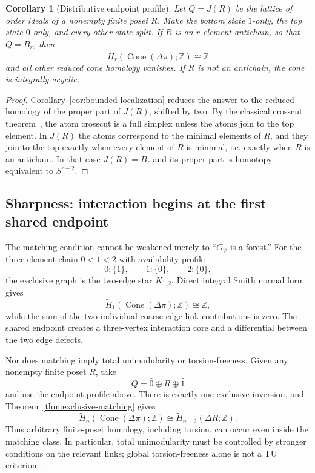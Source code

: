 \documentclass[11pt]{article}
\newtheorem{corollary}[theorem]{Corollary}
\newcommand{\Cone}{\operatorname{Cone}}
\begin{document}
\begin{corollary}[Distributive endpoint profile]
\label{cor:distributive-endpoint}
Let $Q=J(R)$ be the lattice of order ideals of a nonempty finite poset $R$.  Make the
bottom state $1$-only, the top state $0$-only, and every other state split.  If
$R$ is an $r$-element antichain, so that $Q=B_r$, then
\[
\widetilde H_r(\Cone(\Delta\pi);\mathbb Z)\cong\mathbb Z
\]
and all other reduced cone homology vanishes.  If $R$ is not an antichain,
the cone is integrally acyclic.
\end{corollary}

\begin{proof}
Corollary~\ref{cor:bounded-localization} reduces the answer to the reduced
homology of the proper part of $J(R)$, shifted by two.  By the classical crosscut theorem~\cite{Bjorner1995}, the atom crosscut is a
full simplex unless the atoms join to the top element.  In $J(R)$ the atoms
correspond to the minimal elements of $R$, and they join to the top exactly
when every element of $R$ is minimal, i.e. exactly when $R$ is an antichain.
In that case $J(R)=B_r$ and its proper part is homotopy equivalent to
$S^{r-2}$.
\end{proof}

\subsection{Sharpness: interaction begins at the first shared endpoint}

The matching condition cannot be weakened merely to ``$G_\psi$ is a
forest.''  For the three-element chain $0<1<2$ with availability profile
\[
0:\{1\},\qquad 1:\{0\},\qquad 2:\{0\},
\]
the exclusive graph is the two-edge star $K_{1,2}$.  Direct integral Smith
normal form gives
\[
\widetilde H_1(\Cone(\Delta\pi);\mathbb Z)\cong\mathbb Z,
\]
while the sum of the two individual coarse-edge-link contributions is zero.
The shared endpoint creates a three-vertex interaction core and a differential
between the two edge defects.

Nor does matching imply total unimodularity or torsion-freeness.  Given any
nonempty finite poset $R$, take
\[
Q=\hat0\oplus R\oplus\hat1
\]
and use the endpoint profile above.  There is exactly one exclusive inversion,
and Theorem~\ref{thm:exclusive-matching} gives
\[
\widetilde H_n(\Cone(\Delta\pi);\mathbb Z)
\cong
\widetilde H_{n-2}(\Delta R;\mathbb Z).
\]
Thus arbitrary finite-poset homology, including torsion, can occur even inside
the matching class.  In particular, total unimodularity must be controlled by
stronger conditions on the relevant links; global torsion-freeness alone is
not a TU criterion~\cite{DeyHiraniKrishnamoorthy2011}.
\end{document}
